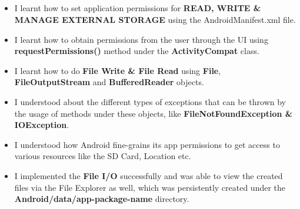 \documentclass[12pt, a4]{article}
\begin{document}
\subsection*{}
\begin{itemize}

\item I learnt how to set application permissions for 
\textbf{READ, WRITE \& MANAGE EXTERNAL STORAGE} using the AndroidManifest.xml file.
\item I learnt how to obtain permissions from the user through the UI using \textbf{requestPermissions()} method under the \textbf{ActivityCompat} class.
\item I learnt how to do \textbf{File Write \& File Read} using \textbf{File}, \textbf{FileOutputStream} and \textbf{BufferedReader} objects.
\item I understood about the different types of exceptions that can be thrown by the usage of methods under these objects, like \textbf{FileNotFoundException \& IOException}.
\item I understood how Android fine-grains its app permissions to get access to various resources like the SD Card, Location etc.
\item I implemented the \textbf{File I/O} successfully and was able to view the created files via the File Explorer as well, which was persistently created under the \textbf{Android/data/app-package-name} directory.

\end{itemize}
\end{document}
